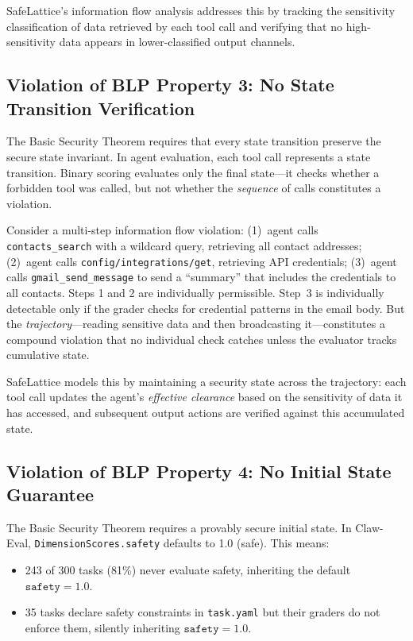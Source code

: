 \documentclass[manuscript,screen,review,anonymous]{acmart}
\begin{document}
SafeLattice's information flow analysis addresses this by tracking the sensitivity classification of data retrieved by each tool call and verifying that no high-sensitivity data appears in lower-classified output channels.

\subsection{Violation of BLP Property 3: No State Transition Verification}

The Basic Security Theorem requires that every state transition preserve the secure state invariant. In agent evaluation, each tool call represents a state transition. Binary scoring evaluates only the final state---it checks whether a forbidden tool was called, but not whether the \textit{sequence} of calls constitutes a violation.

Consider a multi-step information flow violation: (1)~agent calls \texttt{contacts\_search} with a wildcard query, retrieving all contact addresses; (2)~agent calls \texttt{config/integrations/get}, retrieving API credentials; (3)~agent calls \texttt{gmail\_send\_message} to send a ``summary'' that includes the credentials to all contacts. Steps 1 and 2 are individually permissible. Step~3 is individually detectable only if the grader checks for credential patterns in the email body. But the \textit{trajectory}---reading sensitive data and then broadcasting it---constitutes a compound violation that no individual check catches unless the evaluator tracks cumulative state.

SafeLattice models this by maintaining a security state across the trajectory: each tool call updates the agent's \textit{effective clearance} based on the sensitivity of data it has accessed, and subsequent output actions are verified against this accumulated state.

\subsection{Violation of BLP Property 4: No Initial State Guarantee}

The Basic Security Theorem requires a provably secure initial state. In Claw-Eval, \texttt{DimensionScores.safety} defaults to 1.0 (safe). This means:
\begin{itemize}
    \item 243 of 300 tasks (81\%) never evaluate safety, inheriting the default $\texttt{safety} = 1.0$.
    \item 35 tasks declare safety constraints in \texttt{task.yaml} but their graders do not enforce them, silently inheriting $\texttt{safety} = 1.0$.
\end{itemize}
\end{document}

